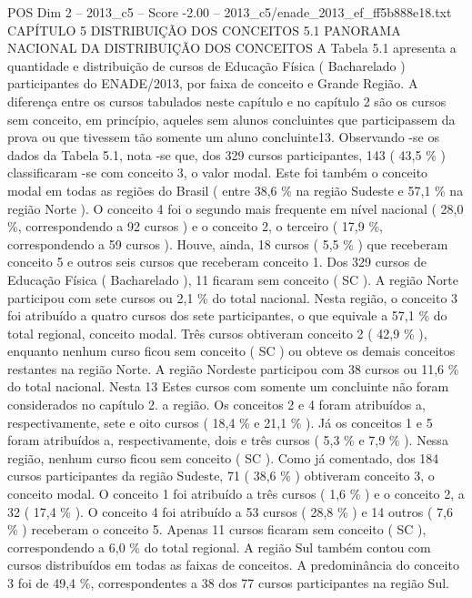 \begin{textsample}{POS Dim 2 – 2013\_c5 – Score -2.00 – 2013\_c5/enade\_2013\_ef\_ff5b888e18.txt}  \label{ex:f2_pos_374}
CAPÍTULO 5 DISTRIBUIÇÃO DOS CONCEITOS 5.1 PANORAMA NACIONAL DA DISTRIBUIÇÃO DOS CONCEITOS A Tabela 5.1 apresenta a quantidade e distribuição de cursos de Educação Física ( Bacharelado ) participantes do ENADE/2013, por faixa de conceito e Grande Região.
A diferença entre os cursos tabulados neste capítulo e no capítulo 2 são os cursos sem conceito, em princípio, aqueles sem alunos concluintes que participassem da prova ou que tivessem tão somente um aluno concluinte13.
Observando -se os dados da Tabela 5.1, nota -se que, dos 329 cursos participantes, 143 ( 43,5 \% ) classificaram -se com conceito 3, o valor modal.
Este foi também o conceito modal em todas as regiões do Brasil ( entre 38,6 \% na região Sudeste e 57,1 \% na região Norte ).
O conceito 4 foi o segundo mais frequente em nível nacional ( 28,0 \%, correspondendo a 92 cursos ) e o conceito 2, o terceiro ( 17,9 \%, correspondendo a 59 cursos ).
Houve, ainda, 18 cursos ( 5,5 \% ) que receberam conceito 5 e outros seis cursos que receberam conceito 1.
Dos 329 cursos de Educação Física ( Bacharelado ), 11 ficaram sem conceito ( SC ).
A região Norte participou com sete cursos ou 2,1 \% do total nacional.
Nesta região, o conceito 3 foi atribuído a quatro cursos dos sete participantes, o que equivale a 57,1 \% do total regional, conceito modal.
Três cursos obtiveram conceito 2 ( 42,9 \% ), enquanto nenhum curso ficou sem conceito ( SC ) ou obteve os demais conceitos restantes na região Norte.
A região Nordeste participou com 38 cursos ou 11,6 \% do total nacional.
Nesta 13 Estes cursos com somente um concluinte não foram considerados no capítulo 2. a região.
Os conceitos 2 e 4 foram atribuídos a, respectivamente, sete e oito cursos ( 18,4 \% e 21,1 \% ).
Já os conceitos 1 e 5 foram atribuídos a, respectivamente, dois e três cursos ( 5,3 \% e 7,9 \% ).
Nessa região, nenhum curso ficou sem conceito ( SC ).
Como já comentado, dos 184 cursos participantes da região Sudeste, 71 ( 38,6 \% ) obtiveram conceito 3, o conceito modal.
O conceito 1 foi atribuído a três cursos ( 1,6 \% ) e o conceito 2, a 32 ( 17,4 \% ).
O conceito 4 foi atribuído a 53 cursos ( 28,8 \% ) e 14 outros ( 7,6 \% ) receberam o conceito 5.
Apenas 11 cursos ficaram sem conceito ( SC ), correspondendo a 6,0 \% do total regional.
A região Sul também contou com cursos distribuídos em todas as faixas de conceitos.
A predominância do conceito 3 foi de 49,4 \%, correspondentes a 38 dos 77 cursos participantes na região Sul.

\end{textsample}
